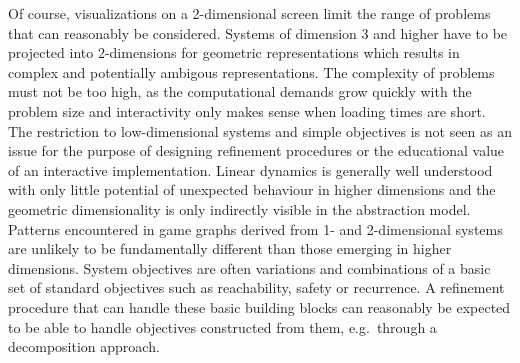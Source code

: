 Of course, visualizations on a 2-dimensional screen limit the range of problems that can reasonably be considered.
Systems of dimension 3 and higher have to be projected into 2-dimensions for geometric representations which results in complex and potentially ambigous representations.
The complexity of problems must not be too high, as the computational demands grow quickly with the problem size and interactivity only makes sense when loading times are short.
The restriction to low-dimensional systems and simple objectives is not seen as an issue for the purpose of designing refinement procedures or the educational value of an interactive implementation.
Linear dynamics is generally well understood with only little potential of unexpected behaviour in higher dimensions and the geometric dimensionality is only indirectly visible in the abstraction model.
Patterns encountered in game graphs derived from 1- and 2-dimensional systems are unlikely to be fundamentally different than those emerging in higher dimensions.
System objectives are often variations and combinations of a basic set of standard objectives such as reachability, safety or recurrence.
A refinement procedure that can handle these basic building blocks can reasonably be expected to be able to handle objectives constructed from them, e.g.\ through a decomposition approach.

